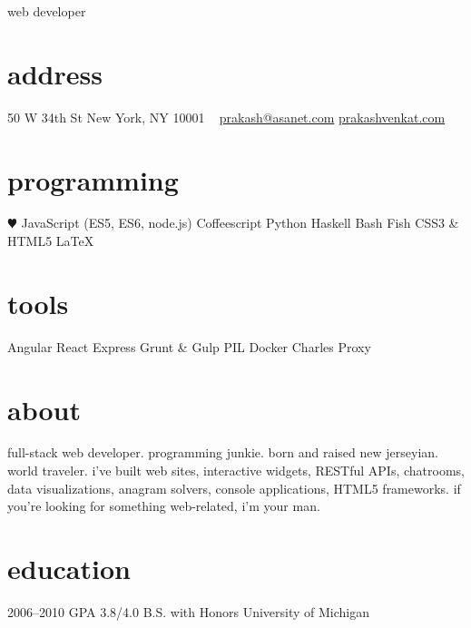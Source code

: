 \documentclass[]{friggeri-cv}
\begin{document}
       {web developer}


\begin{aside}
  \section{address}
    50 W 34th St
    New York, NY 10001
    ~
    \href{mailto:prakash@asanet.com}{prakash@asanet.com}
    \href{http://prakashvenkat.com}{prakashvenkat.com}
  \section{programming}
    {\color{red} $\varheartsuit$} JavaScript
    (ES5, ES6, node.js)
    Coffeescript
    Python
    Haskell
    Bash
    Fish
    CSS3 \& HTML5
    LaTeX
  \section{tools}
    Angular
    React
    Express
    Grunt \& Gulp
    PIL
    Docker
    Charles Proxy
\end{aside}

\section{about}
full-stack web developer. programming junkie. born and raised new jerseyian. world traveler. i've built web sites, interactive widgets,
RESTful APIs, chatrooms, data visualizations, anagram solvers, console applications, 
HTML5 frameworks. if you're looking for something web-related, i'm your man.

\section{education}

\begin{entrylist}
  \entry
    {2006–2010}
    {GPA 3.8/4.0}
    {B.S. with Honors}
    {University of Michigan}
\end{entrylist}
\end{document}
